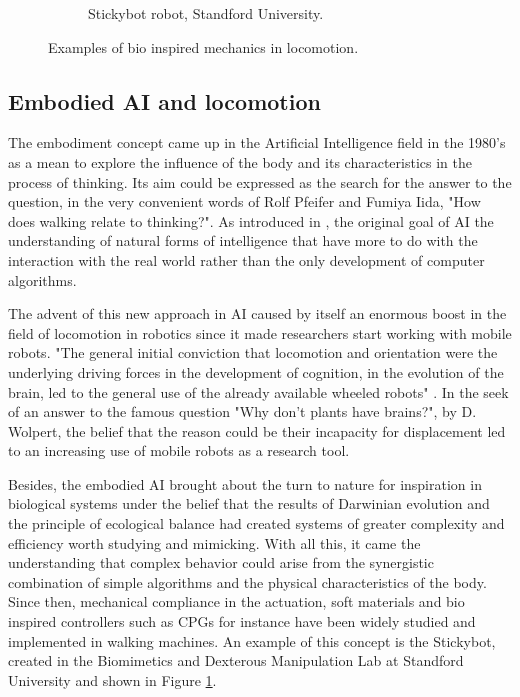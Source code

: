 \begin{figure}[htb]
\begin{subfigure}[t]{0.35\textwidth}
        \caption{Stickybot robot, Standford University.}
        \label{fig:stickybot}
    \end{subfigure}
\caption{Examples of bio inspired mechanics in locomotion.}
\label{fig:figure1}
\end{figure}

\subsection{Embodied AI and locomotion} %
\label{sub:the_embodiment_}
The embodiment concept came up in the Artificial Intelligence field in the 1980's as a mean to explore the influence of the body and its characteristics in the process of thinking. 
Its aim could be expressed as the search for the answer to the question, in the very convenient words of Rolf Pfeifer and Fumiya Iida, "How does walking relate to thinking?".
As introduced in \cite{pfeifer}, the original goal of AI the understanding of natural forms of intelligence that have more to do with the interaction with the real world rather than the only development of computer algorithms.

The advent of this new approach in AI caused by itself an enormous boost in the field of locomotion in robotics since it made researchers start working with mobile robots.
"The general initial conviction that locomotion and orientation were the underlying driving forces in the development of cognition, in the evolution of the brain, led to the general use of the already available wheeled robots" \cite{pfeifer}.
In the seek of an answer to the famous question "Why don’t plants have brains?", by D. Wolpert, the belief that the reason could be their incapacity for displacement led to an increasing use of mobile robots as a research tool.

Besides, the embodied AI brought about the turn to nature for inspiration in biological systems under the belief that the results of Darwinian evolution and the principle of ecological balance had created systems of greater complexity and efficiency worth studying and mimicking.
With all this, it came the understanding that complex behavior could arise from the synergistic combination of simple algorithms and the physical characteristics of the body.
Since then, mechanical compliance in the actuation, soft materials and bio inspired controllers such as CPGs for instance have been widely studied and implemented in walking machines. 
An example of this concept is the Stickybot, created in the Biomimetics and Dexterous Manipulation Lab at Standford University and shown in Figure \ref{fig:stickybot}.

